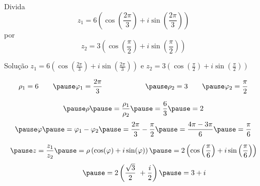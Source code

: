 \begin{question}
  Divida
  \[
    z_1 = 6\left(\cos\left(\frac{2\pi}{3}\right) + i\sin\left(\frac{2\pi}{3}\right)\right)
  \]
  por
  \[
    z_2 = 3\left(\cos\left(\frac{\pi}{2}\right) + i\sin\left(\frac{\pi}{2}\right)\right)
  \]
\end{question}

\begin{resolution}{Solução}
  \(z_1 = 6\left(\cos\left(\frac{2\pi}{3}\right) + i\sin\left(\frac{2\pi}{3}\right)\right)\) e
  \(z_2 = 3\left(\cos\left(\frac{\pi}{2}\right) + i\sin\left(\frac{\pi}{2}\right)\right)\)

  \pause
  \[
    \rho_1 = 6
    \qquad
    \pause
    \varphi_1 = \frac{2\pi}{3}
    \qquad\qquad\qquad
    \pause
    \rho_2 = 3
    \qquad
    \pause
    \varphi_2 = \frac{\pi}{2}
  \]

  \[
    \pause
    \rho
    \pause
    = \frac{\rho_1}{\rho_2}
    \pause
    = \frac{6}{3}
    \pause
    = 2
  \]
  \[
    \pause
    \varphi
    \pause
    = \varphi_1 - \varphi_2
    \pause
    = \frac{2\pi}{3} - \frac{\pi}{2}
    \pause
    = \frac{4\pi - 3\pi}{6}
    \pause
    = \frac{\pi}{6}
  \]

  \[
    \pause
    z = \frac{z_1}{z_2}
    \pause
    = \rho\left(\cos(\varphi)+i\sin(\varphi)\right)
    \pause
    = 2\left(\cos\left(\frac{\pi}{6}\right)+i\sin\left(\frac{\pi}{6}\right)\right)
  \]
  \[
    \hphantom{z = \frac{z_1}{z_2}}
    \pause
    = 2\left(\frac{\sqrt{3}}{2}\ + \frac{i}{2}\right)
    \pause
    = 3 + i
  \]
\end{resolution}

